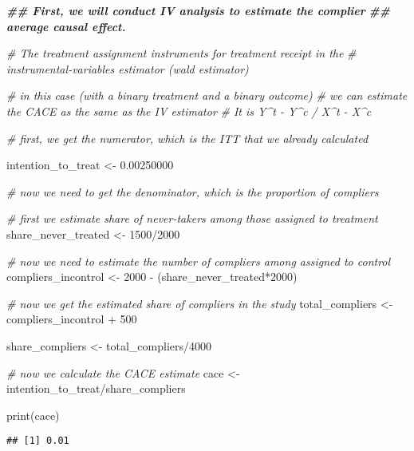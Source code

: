 \documentclass[
]{article}
\newenvironment{Shaded}{\begin{snugshade}}{\end{snugshade}}
\newcommand{\CommentTok}[1]{\textcolor[rgb]{0.56,0.35,0.01}{\textit{#1}}}
\newcommand{\DecValTok}[1]{\textcolor[rgb]{0.00,0.00,0.81}{#1}}
\newcommand{\DocumentationTok}[1]{\textcolor[rgb]{0.56,0.35,0.01}{\textbf{\textit{#1}}}}
\newcommand{\FloatTok}[1]{\textcolor[rgb]{0.00,0.00,0.81}{#1}}
\newcommand{\FunctionTok}[1]{\textcolor[rgb]{0.00,0.00,0.00}{#1}}
\newcommand{\NormalTok}[1]{#1}
\newcommand{\OtherTok}[1]{\textcolor[rgb]{0.56,0.35,0.01}{#1}}
\newcommand{\SpecialCharTok}[1]{\textcolor[rgb]{0.00,0.00,0.00}{#1}}
\begin{document}
\begin{Shaded}
\begin{Highlighting}[]
\DocumentationTok{\#\# First, we will conduct IV analysis to estimate the complier }
\DocumentationTok{\#\# average causal effect.}

\CommentTok{\# The treatment assignment instruments for treatment receipt in the }
\CommentTok{\# instrumental{-}variables estimator (wald estimator)}

\CommentTok{\# in this case (with a binary treatment and a binary outcome)}
\CommentTok{\# we can estimate the CACE as the same as the IV estimator}
\CommentTok{\# It is Y\^{}t {-} Y\^{}c / X\^{}t {-} X\^{}c}

\CommentTok{\# first, we get the numerator, which is the ITT that we already calculated}

\NormalTok{intention\_to\_treat }\OtherTok{\textless{}{-}} \FloatTok{0.00250000}

\CommentTok{\# now we need to get the denominator, which is the proportion of compliers}

\CommentTok{\# first we estimate share of never{-}takers among those assigned to treatment}
\NormalTok{share\_never\_treated }\OtherTok{\textless{}{-}} \DecValTok{1500}\SpecialCharTok{/}\DecValTok{2000}

\CommentTok{\# now we need to estimate the number of compliers among assigned to control}
\NormalTok{compliers\_incontrol }\OtherTok{\textless{}{-}} \DecValTok{2000} \SpecialCharTok{{-}}\NormalTok{ (share\_never\_treated}\SpecialCharTok{*}\DecValTok{2000}\NormalTok{)}

\CommentTok{\# now we get the estimated share of compliers in the study }
\NormalTok{total\_compliers }\OtherTok{\textless{}{-}}\NormalTok{ compliers\_incontrol }\SpecialCharTok{+} \DecValTok{500} 

\NormalTok{share\_compliers }\OtherTok{\textless{}{-}}\NormalTok{ total\_compliers}\SpecialCharTok{/}\DecValTok{4000}

\CommentTok{\# now we calculate the CACE estimate}
\NormalTok{cace }\OtherTok{\textless{}{-}}\NormalTok{ intention\_to\_treat}\SpecialCharTok{/}\NormalTok{share\_compliers}

\FunctionTok{print}\NormalTok{(cace)}
\end{Highlighting}
\end{Shaded}

\begin{verbatim}
## [1] 0.01
\end{verbatim}
\end{document}
